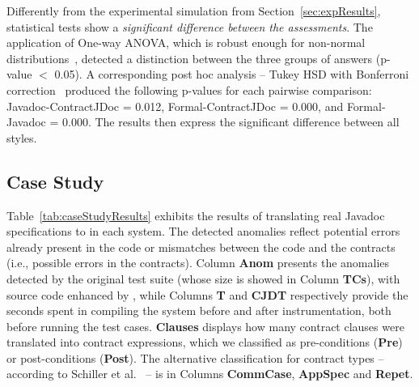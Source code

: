 \begin{figure}
\centering
\end{figure}


Differently from the experimental simulation from Section~\ref{sec:expResults}, statistical tests show a \emph{significant difference between the assessments}. The application of One-way ANOVA, which is robust enough for non-normal distributions~\cite{statistical}, detected a distinction between the three groups of answers (p-value $<$ 0.05). A corresponding post hoc analysis -- Tukey HSD 
with Bonferroni correction~\cite{statistical} produced the following p-values for each pairwise comparison: Javadoc-ContractJDoc = 0.012, Formal-ContractJDoc = 0.000, and Formal-Javadoc = 0.000. The results then express the significant difference between all styles.

% 
% 
% 
% 
% 
% 




\subsection{Case Study}

Table~\ref{tab:caseStudyResults} exhibits the results of translating real Javadoc specifications to \contractjdoc{} in each system.
The detected anomalies reflect potential errors already present in the code or mismatches between the code and the contracts (i.e., possible errors in the contracts).
Column \textbf{Anom} presents the anomalies detected by the original test suite (whose size is showed in Column \textbf{TCs}), with source code enhanced by \contractjdoc{}, while Columns \textbf{T} and \textbf{CJDT} respectively provide the seconds spent in compiling the system before and after \contractjdoc{} instrumentation, both before running the test cases. 
\textbf{Clauses} displays how many contract clauses were translated into contract expressions, which we classified as pre-conditions (\textbf{Pre}) or post-conditions (\textbf{Post}). The alternative classification for contract types -- according to Schiller et al.~\cite{typeContracts} -- is in Columns \textbf{CommCase}, \textbf{AppSpec} and \textbf{Repet}.

